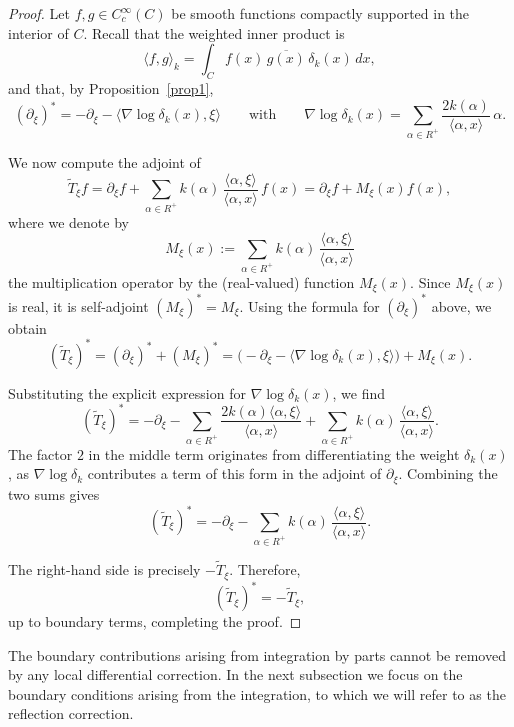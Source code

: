 \documentclass[12pt]{article}
\newcommand{\1}{\mathbbm{1}}
\theoremstyle{definition}
\begin{document}
\begin{proof}
Let $f,g \in C_c^\infty(C)$ be smooth functions compactly supported in the interior of $C$.
Recall that the weighted inner product is
\[
  \langle f,g \rangle_k = \int_C f(x)\,\overline{g(x)}\,\delta_k(x)\,dx,
\]
and that, by Proposition~\ref{prop1},
\[
  (\partial_\xi)^* = -\partial_\xi - \langle \nabla \log \delta_k(x), \xi \rangle
  \qquad\text{with}\qquad
  \nabla \log \delta_k(x)
  = \sum_{\alpha \in R^+} \frac{2k(\alpha)}{\langle \alpha, x\rangle}\,\alpha.
\]

\noindent
We now compute the adjoint of
\[
  \widetilde{T}_\xi f
  = \partial_\xi f
    + \sum_{\alpha \in R^+} k(\alpha)\,
      \frac{\langle \alpha,\xi\rangle}{\langle \alpha,x\rangle}\,f(x)
  = \partial_\xi f + M_\xi(x)f(x),
\]
where we denote by
\[
  M_\xi(x) := \sum_{\alpha \in R^+} k(\alpha)\,\frac{\langle \alpha,\xi\rangle}{\langle \alpha,x\rangle}
\]
the multiplication operator by the (real-valued) function $M_\xi(x)$. Since $M_\xi(x)$ is real, it is self-adjoint $(M_\xi)^* = M_\xi$. Using the formula for $(\partial_\xi)^*$ above, we obtain
\[
  (\widetilde{T}_\xi)^*
  = (\partial_\xi)^* + (M_\xi)^*
  = \big(-\partial_\xi - \langle \nabla \log \delta_k(x), \xi \rangle\big)
    + M_\xi(x).
\]

\noindent
Substituting the explicit expression for $\nabla \log \delta_k(x)$, we find
\[
  (\widetilde{T}_\xi)^*
  = -\partial_\xi
    - \sum_{\alpha \in R^+} \frac{2k(\alpha)\langle \alpha,\xi\rangle}{\langle \alpha,x\rangle}
    + \sum_{\alpha \in R^+} k(\alpha)\,\frac{\langle \alpha,\xi\rangle}{\langle \alpha,x\rangle}.
\]
The factor $2$ in the middle term originates from differentiating the weight
$\delta_k(x)$, as $\nabla \log \delta_k$ contributes a term of this form in the adjoint of $\partial_\xi$.
Combining the two sums gives
\[
  (\widetilde{T}_\xi)^*
  = -\partial_\xi
    - \sum_{\alpha \in R^+} k(\alpha)\,\frac{\langle \alpha,\xi\rangle}{\langle \alpha,x\rangle}.
\]

\noindent
The right-hand side is precisely $-\widetilde{T}_\xi$. Therefore,
\[
  (\widetilde{T}_\xi)^* = -\widetilde{T}_\xi,
\]
up to boundary terms, completing the proof.
\end{proof}




The boundary contributions arising from integration by parts cannot be removed by any
local differential correction. In the next subsection we focus on the boundary conditions arising from the integration, to which we will refer to as the reflection correction.
\end{document}
